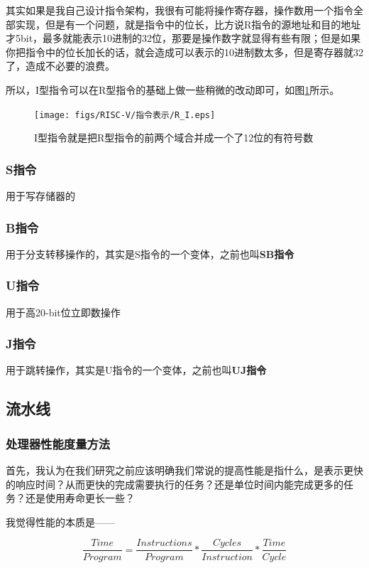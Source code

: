 其实如果是我自己设计指令架构，我很有可能将操作寄存器，操作数用一个指令全部实现，但是有一个问题，就是指令中的位长，比方说R指令的源地址和目的地址才5bit，最多就能表示10进制的32位，那要是操作数字就显得有些有限；但是如果你把指令中的位长加长的话，就会造成可以表示的10进制数太多，但是寄存器就32了，造成不必要的浪费。

所以，I型指令可以在R型指令的基础上做一些稍微的改动即可，如图\ref{fig:R_I}所示。

\begin{figure}[htbp]
  \centering %
  \texttt{[image: figs/RISC-V/指令表示/R\_I.eps]}
  \caption{I型指令就是把R型指令的前两个域合并成一个了12位的有符号数}
  \label{fig:R_I} %
\end{figure}



\subsubsection{S指令}
用于写存储器的

\subsubsection{B指令}
用于分支转移操作的，其实是S指令的一个变体，之前也叫\textbf{SB指令}

\subsubsection{U指令}
用于高20-bit位立即数操作

\subsubsection{J指令}
用于跳转操作，其实是U指令的一个变体，之前也叫\textbf{UJ指令}


\subsection{流水线}
\subsubsection{处理器性能度量方法}
首先，我认为在我们研究之前应该明确我们常说的提高性能是指什么，是表示更快的响应时间？从而更快的完成需要执行的任务？还是单位时间内能完成更多的任务？还是使用寿命更长一些？

我觉得性能的本质是——

\begin{equation}\label{eq:Computer_Analogy}
    \frac{ Time }{ Program } = \frac{ Instructions }{ Program } * \frac{ Cycles }{ Instruction } * \frac{ Time }{ Cycle }
\end{equation}

